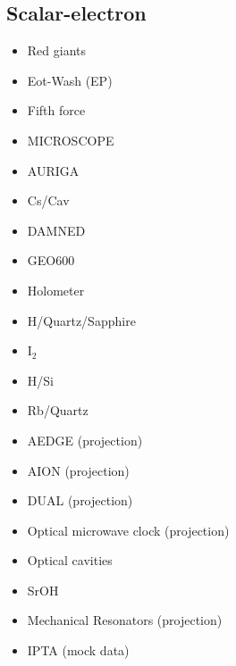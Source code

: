 \documentclass[9pt,twocolumn]{extarticle}
\begin{document}
\begin{mdframed}
\subsection*{Scalar-electron}\vspace{-0.5em}
\begin{itemize}\setlength\itemsep{-0.5em}
	\item Red giants~\cite{Hardy:2016kme}
	\item Eot-Wash (EP)~\cite{Hees:2018fpg}
	\item Fifth force~\cite{Arvanitaki:2015iga}
	\item MICROSCOPE~\cite{Berge:2017ovy}
		\item AURIGA~\cite{Branca:2016rez}
	\item Cs/Cav~\cite{Tretiak:2022ndx}
	\item DAMNED~\cite{Savalle:2020vgz}
	\item GEO600~\cite{Vermeulen:2021epa}
	\item Holometer~\cite{Aiello:2021wlp}
	\item H/Quartz/Sapphire~\cite{Campbell:2020fvq}
	\item I$_2$~\cite{Oswald:2021vtc}
	\item H/Si~\cite{Kennedy:2020bac}
	\item Rb/Quartz~\cite{Zhang:2022ewz}
	\item AEDGE (projection)~\cite{Badurina:2021rgt}
	\item AION (projection)~\cite{Badurina:2021rgt}
	\item DUAL (projection)~\cite{Arvanitaki:2015iga}
		\item Optical microwave clock (projection)~\cite{Arvanitaki:2015iga}
\item Optical cavities~\cite{Geraci:2018fax}
\item SrOH~\cite{SrOH}
		\item Mechanical Resonators (projection)~\cite{Manley:2019vxy}
			\item IPTA (mock data)~\cite{Kaplan:2022lmz}

\end{itemize}
\end{mdframed}
\end{document}
